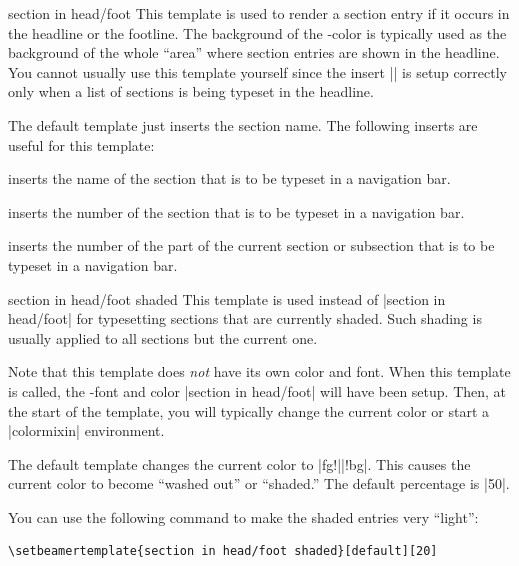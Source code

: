 \begin{element}{section in head/foot}\yes\yes\yes
  This template is used to render a section entry if it occurs in the headline or the footline. The background of the \beamer-color is typically used as the background of the whole ``area'' where section entries are shown in the headline. You cannot usually use this template yourself since the insert |\insertsectionhead| is setup correctly only when a list of sections is being typeset in the headline.

  The default template just inserts the section name. The following inserts are useful for this template:
  \begin{itemize}
    \iteminsert{\insertsectionhead}
    inserts the name of the section that is to be typeset in a navigation bar.

    \iteminsert{\insertsectionheadnumber}
    inserts the number of the section that is to be typeset in a navigation bar.

    \iteminsert{\insertpartheadnumber}
    inserts the number of the part of the current section or subsection that is to be typeset in a navigation bar.
  \end{itemize}
\end{element}

\begin{element}{section in head/foot shaded}\yes\no\no
  This template is used instead of |section in head/foot| for typesetting sections that are currently shaded. Such shading is usually applied to all sections but the current one.

  Note that this template does \emph{not} have its own color and font. When this template is called, the \beamer-font and color |section in head/foot| will have been setup. Then, at the start of the template, you will typically change the current color or start a |colormixin| environment.

  \begin{templateoptions}
    The default template changes the current color to |fg!||!bg|. This causes the current color to become ``washed out'' or ``shaded.'' The default percentage is |50|.

    \example
    You can use the following command to make the shaded entries very ``light'':

\begin{verbatim}
\setbeamertemplate{section in head/foot shaded}[default][20]
\end{verbatim}
  \end{templateoptions}
\end{element}

